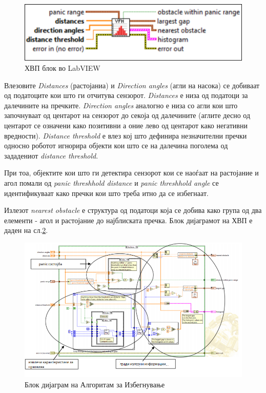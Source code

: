 \documentclass[11pt]{article}
\begin{document}
  \begin{figure}[H]
    \centering
    \includegraphics[width=0.5\linewidth]{./images/vfh_lv.png}
    \caption{ХВП блок во LabVIEW}
    \label{fig:vfh_lv.png}
    \end{figure}

  Влезовите \textit{Distances} (растојаниа) и \textit{Direction angles} (агли на насока) се добиваат од податоците кои што ги отчитува сензорот. \textit{Distances} е низа од податоци за далечините на пречките. \textit{Direction angles} аналогно е низа со агли кои што започнуваат од центарот на сензорот до секоја од далечините (аглите десно од центарот се означени како позитивни а оние лево од центарот како негативни вредности). \textit{Distance threshold} е влез кој што дефинира незначителни пречки односно роботот игнорира објекти кои што се на далечина поголема од зададениот \textit{distance threshold}.

  При тоа, објектите кои што ги детектира сензорот кои се наоѓаат на растојание и агол помали од \textit{panic threshhold distance} и \textit{panic threshhold angle} се идентификуваат како пречки кои што треба итно да се избегнаат.

  Излезот \textit{nearest obstacle} е структура од податоци која се добива како група од два елементи - агол и растојание до најблиската пречка. Блок дијаграмот на ХВП е даден на сл.\ref{fig:vfh_block_diagram.png}.

  \begin{figure}[H]
    \includegraphics[width=0.75\linewidth]{vfh_block_diagram.png}
    \centering
    \caption{Блок дијаграм на Алгоритам за Избегнување}
    \label{fig:vfh_block_diagram.png}
    \end{figure}
\end{document}
